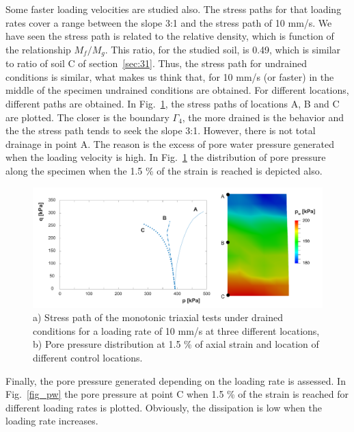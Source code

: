 \documentclass[preprint,12pt,a4paper]{elsarticle}
\begin{document}
Some faster loading velocities are studied also. The stress paths for that loading rates cover a range between the slope 3:1 and the stress path of 10 mm/s. We have seen the stress path is related to the relative density, which is function of the relationship $M_f/M_g$. This ratio, for the studied soil, is 0.49, which is similar to ratio of soil C of section~\ref{sec:31}. Thus, the stress path for undrained conditions is similar, what makes us think that, for 10 mm/s (or faster) in the middle of the specimen undrained conditions are obtained. For different locations, different paths are obtained. In Fig.~\ref{fig_drained_abc}, the stress paths of locations A, B and C are plotted. The closer is the boundary  $\Gamma_4$, the more drained is the behavior and the the stress path tends to seek the slope 3:1. However, there is not total drainage in point A. The reason is the excess of pore water pressure generated when the loading velocity is high. In Fig.~\ref{fig_drained_abc} the distribution of pore pressure along the specimen when the 1.5 \% of the strain is reached is depicted also.

\begin{figure}
\centering
\includegraphics[width=1.01\textwidth]{Figs/drained_abc.pdf}
\caption{a) Stress path of the monotonic triaxial tests under drained conditions for a loading rate of 10 mm/s at three different locations, b) Pore pressure distribution at 1.5 \% of axial strain and location of different control locations.}
\label{fig_drained_abc}
\end{figure}

Finally, the pore pressure generated depending on the loading rate is assessed. In Fig.~\ref{fig_pw} the pore pressure at point C when 1.5 \% of the strain is reached for different loading rates is plotted. Obviously, the dissipation is low when the loading rate increases.
\end{document}
